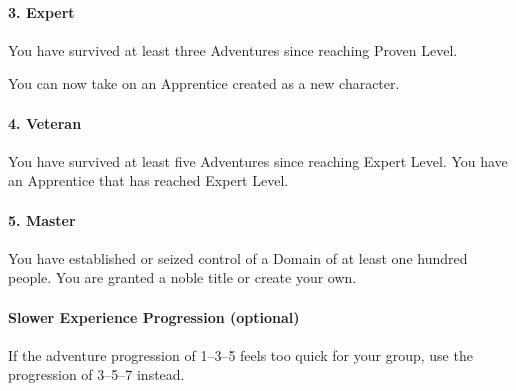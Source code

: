 \documentclass[itdr]{subfiles}
\begin{document}
\vfill
\paragraph{3. Expert}
You have survived at least three Adventures since reaching Proven Level.

You can now take on an Apprentice created as a new character.

\vfill
\paragraph{4. Veteran}
You have survived at least five Adventures since reaching Expert Level. You have an Apprentice that has reached Expert Level.

\vfill
\paragraph{5. Master}
You have established or seized control of a Domain of at least one hundred people. You are granted a noble title or create your own.

\vfill

\begin{dbox}
	\paragraph{Slower Experience Progression (optional)}
	If the adventure progression of 1--3--5 feels too quick for your group, use the progression of 3--5--7 instead.
\end{dbox}

\vfill
\end{document}
